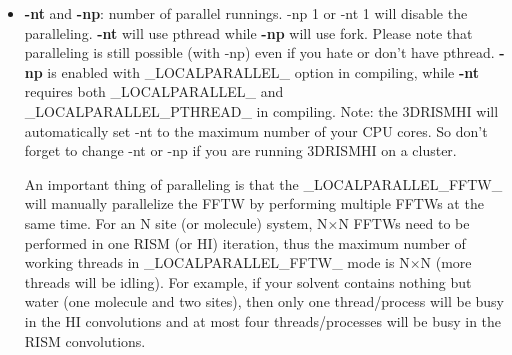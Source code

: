\documentclass[aip,amsmath,amssymb,reprint,onecolumn]{revtex4-1}
\begin{document}
\begin{itemize}
    \item {\bf -nt} and {\bf -np}: number of parallel runnings. -np 1 or -nt 1 will disable the paralleling. {\bf -nt} will use pthread while {\bf -np} will use fork. Please note that paralleling is still possible (with -np) even if you hate or don't have pthread. {\bf -np} is enabled with \_LOCALPARALLEL\_ option in compiling, while {\bf -nt} requires both \_LOCALPARALLEL\_ and \_LOCALPARALLEL\_PTHREAD\_ in compiling. Note: the 3DRISMHI will automatically set -nt to the maximum number of your CPU cores. So don't forget to change -nt or -np if you are running 3DRISMHI on a cluster.

        An important thing of paralleling is that the \_LOCALPARALLEL\_FFTW\_ will manually parallelize the FFTW by performing multiple FFTWs at the same time. For an N site (or molecule) system, N$\times$N FFTWs need to be performed in one RISM (or HI) iteration, thus the maximum number of working threads in \_LOCALPARALLEL\_FFTW\_ mode is N$\times$N (more threads will be idling). For example, if your solvent contains nothing but water (one molecule and two sites), then only one thread/process will be busy in the HI convolutions and at most four threads/processes will be busy in the RISM convolutions.


\end{itemize}
\end{document}
